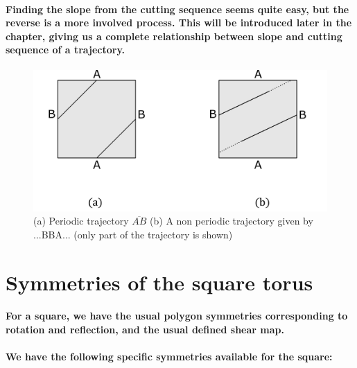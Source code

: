 \documentclass{report}
\begin{document}

\paragraph{Finding the slope from the cutting sequence seems quite easy, but the reverse is a more involved process. This will be introduced later in the chapter, giving us a complete relationship between slope and cutting sequence of a trajectory.}


\begin{figure} 
\begin{center}
\includegraphics[scale=0.3]{2.4}
\caption{(a) Periodic trajectory $\overline{AB}$ (b) A non periodic trajectory given by ...BBA... (only part of the trajectory is shown)}
\end{center}
\end{figure}

\pagebreak

\section{Symmetries of the square torus}

\paragraph{For a square, we have the usual polygon symmetries corresponding to rotation and reflection, and the usual defined shear map.}

\paragraph{We have the following specific symmetries available for the square:}
\end{document}
